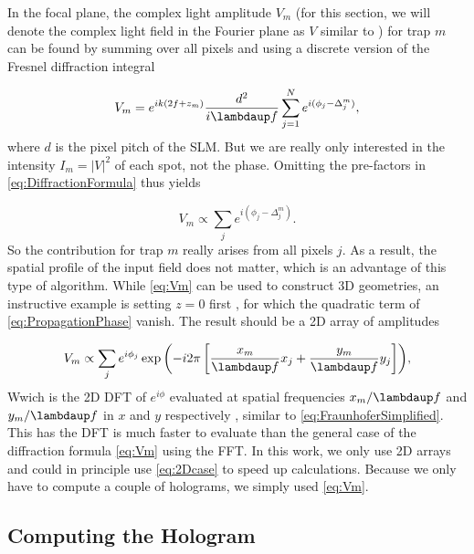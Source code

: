 In the focal plane, the complex light amplitude $V_m$ (for this section, we will denote the complex light field in the Fourier plane as $V$ similar to \cite{DiLeonardo2007}) for trap $m$ can be found by summing over all pixels and using a discrete version of the Fresnel diffraction integral \cite{Leseleuc2018}

\begin{equation}\label{eq:DiffractionFormula}
    V_m = e^{i k \left(2 f + z_m\right)}
    \frac{d^2}{i \lambdaup f} \sum_{j=1}^N e^{i(\phi_j - \Delta_j^m)},
\end{equation}
where $d$ is the pixel pitch of the SLM. 
But we are really only interested in the intensity $I_m =|V|^2$ of each spot, not the phase.
Omitting the pre-factors in \cref{eq:DiffractionFormula} thus yields

\begin{equation}\label{eq:Vm}
    V_m \propto \sum_{j} e^{i(\phi_j - \Delta_j^m)}.
\end{equation}
So the contribution for trap $m$ really arises from all pixels $j$. 
As a result, the spatial profile of the input field does not matter, which is an advantage of this type of algorithm. While \cref{eq:Vm} can be used to construct 3D geometries, an instructive example is setting $z=0$ first \cite{DiLeonardo2007}, for which the quadratic term of \cref{eq:PropagationPhase} vanish.
The result should be a 2D array of amplitudes

\begin{equation}\label{eq:2Dcase}
    V_m \propto \sum_j e^{i\phi_j} \exp{\left(
    - i 2\pi \left[
    \frac{x_m}{\lambdaup f} x_j + \frac{y_m}{\lambdaup f} y_j
    \right]
    \right)},
\end{equation}
Wwich is the 2D \ac{DFT} of $e^{i\phi}$ evaluated at spatial frequencies $x_m/\lambdaup f$ and $y_m/\lambdaup f$ in $x$ and $y$ respectively \cite{DiLeonardo2007,Bijnen2015}, similar to \cref{eq:FraunhoferSimplified}.
This has the DFT is much faster to evaluate than the general case of the diffraction formula \cref{eq:Vm} using the \ac{FFT}.
In this work, we only use 2D arrays and could in principle use \cref{eq:2Dcase} to speed up calculations.
Because we only have to compute a couple of holograms, we simply used \cref{eq:Vm}.

\subsection{Computing the Hologram}\label{sec:GSW}


